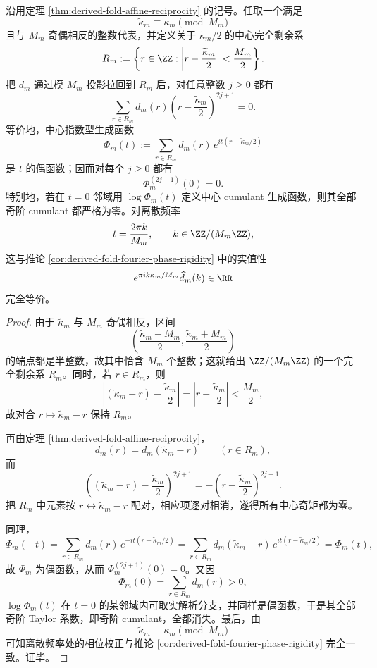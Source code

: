 \begin{corollary}[折叠多重度剖面的中心奇矩全消失]\label{cor:derived-fold-centered-odd-moments-vanish}
沿用定理 \ref{thm:derived-fold-affine-reciprocity} 的记号。任取一个满足
\[
\widetilde\kappa_m\equiv \kappa_m\pmod{M_m}
\]
且与 \(M_m\) 奇偶相反的整数代表，并定义关于 \(\widetilde\kappa_m/2\) 的中心完全剩余系
\[
R_m:=
\left\{
r\in\ZZ:
\left|r-\frac{\widetilde\kappa_m}{2}\right|
<
\frac{M_m}{2}
\right\}.
\]
把 \(d_m\) 通过模 \(M_m\) 投影拉回到 \(R_m\) 后，对任意整数 \(j\ge 0\) 都有
\[
\sum_{r\in R_m}
d_m(r)
\left(r-\frac{\widetilde\kappa_m}{2}\right)^{2j+1}
=
0.
\]
等价地，中心指数型生成函数
\[
\Phi_m(t):=
\sum_{r\in R_m}
d_m(r)\,
e^{it(r-\widetilde\kappa_m/2)}
\]
是 \(t\) 的偶函数；因而对每个 \(j\ge 0\) 都有
\[
\Phi_m^{(2j+1)}(0)=0.
\]
特别地，若在 \(t=0\) 邻域用 \(\log\Phi_m(t)\) 定义中心 cumulant 生成函数，则其全部奇阶 cumulant 都严格为零。对离散频率
\[
t=\frac{2\pi k}{M_m},
\qquad
k\in \ZZ/(M_m\ZZ),
\]
这与推论 \ref{cor:derived-fold-fourier-phase-rigidity} 中的实值性
\[
e^{\pi i k\kappa_m/M_m}\widehat d_m(k)\in \RR
\]
完全等价。
\end{corollary}

\begin{proof}
由于 \(\widetilde\kappa_m\) 与 \(M_m\) 奇偶相反，区间
\[
\left(
\frac{\widetilde\kappa_m-M_m}{2},
\frac{\widetilde\kappa_m+M_m}{2}
\right)
\]
的端点都是半整数，故其中恰含 \(M_m\) 个整数；这就给出 \(\ZZ/(M_m\ZZ)\) 的一个完全剩余系 \(R_m\)。同时，若 \(r\in R_m\)，则
\[
\left|
(\widetilde\kappa_m-r)-\frac{\widetilde\kappa_m}{2}
\right|
=
\left|
r-\frac{\widetilde\kappa_m}{2}
\right|
<
\frac{M_m}{2},
\]
故对合 \(r\mapsto \widetilde\kappa_m-r\) 保持 \(R_m\)。

再由定理 \ref{thm:derived-fold-affine-reciprocity}，
\[
d_m(r)=d_m(\widetilde\kappa_m-r)
\qquad
(r\in R_m),
\]
而
\[
\left(
(\widetilde\kappa_m-r)-\frac{\widetilde\kappa_m}{2}
\right)^{2j+1}
=
-\left(
r-\frac{\widetilde\kappa_m}{2}
\right)^{2j+1}.
\]
把 \(R_m\) 中元素按 \(r\leftrightarrow \widetilde\kappa_m-r\) 配对，相应项逐对相消，遂得所有中心奇矩都为零。

同理，
\[
\Phi_m(-t)
=
\sum_{r\in R_m}
d_m(r)\,
e^{-it(r-\widetilde\kappa_m/2)}
=
\sum_{r\in R_m}
d_m(\widetilde\kappa_m-r)\,
e^{it(r-\widetilde\kappa_m/2)}
=
\Phi_m(t),
\]
故 \(\Phi_m\) 为偶函数，从而 \(\Phi_m^{(2j+1)}(0)=0\)。又因
\[
\Phi_m(0)=\sum_{r\in R_m}d_m(r)>0,
\]
\(\log\Phi_m(t)\) 在 \(t=0\) 的某邻域内可取实解析分支，并同样是偶函数，于是其全部奇阶 Taylor 系数，即奇阶 cumulant，全都消失。最后，由
\[
\widetilde\kappa_m\equiv \kappa_m\pmod{M_m}
\]
可知离散频率处的相位校正与推论 \ref{cor:derived-fold-fourier-phase-rigidity} 完全一致。证毕。
\end{proof}

